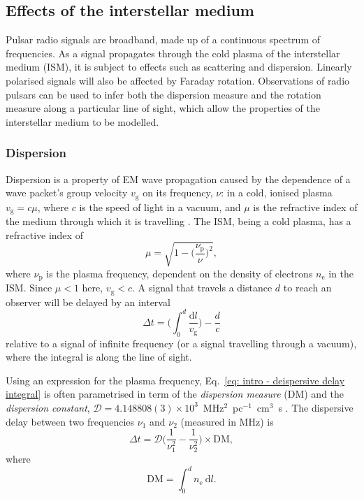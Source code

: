 \subsection{Effects of the interstellar medium}
\label{sec: intro - observation processing - ISM effects}

Pulsar radio signals are broadband, made up of a continuous spectrum of frequencies. As a signal propagates through the cold plasma of the interstellar medium (ISM), it is subject to effects such as scattering and dispersion. Linearly polarised signals will also be affected by Faraday rotation. Observations of radio pulsars can be used to infer both the dispersion measure and the rotation measure along a particular line of sight, which allow the properties of the interstellar medium to be modelled.

\subsubsection{Dispersion}
\label{sec: intro - observation processing - ISM effects - dispersion}

Dispersion is a property of EM wave propagation caused by the dependence of a wave packet's group velocity $v_\mathrm{g}$ on its frequency, $\nu$: in a cold, ionised plasma $v_\mathrm{g} = c\mu$, where $c$ is the speed of light in a vacuum, and $\mu$ is the refractive index of the medium through which it is travelling \citep{Handbook}. The ISM, being a cold plasma, has a refractive index of 
\begin{equation}
    \label{eq: intro - ISM refractive index}
    \mu = \sqrt{1-\bigg(\frac{\nu_\mathrm{p}}{\nu}\bigg)^2},
\end{equation}
where $\nu_\mathrm{p}$ is the plasma frequency, dependent on the density of electrons $n_\mathrm{e}$ in the ISM. Since $\mu < 1$ here, $v_\mathrm{g} < c$. A signal that travels a distance $d$ to reach an observer will be delayed by an interval
\begin{equation}
    \label{eq: intro - deispersive delay integral}
    \Delta t = \bigg( \int^d_0 \frac{\mathrm{d}l}{v_\mathrm{g}} \bigg) - \frac{d}{c}
\end{equation}
relative to a signal of infinite frequency (or a signal travelling through a vacuum), where the integral is along the line of sight.

Using an expression for the plasma frequency, Eq.~\ref{eq: intro - deispersive delay integral} is often parametrised in term of the \textit{dispersion measure} (DM) and the \textit{dispersion constant},  $\mathcal{D} = 4.148808(3)\times 10^3$~MHz$^2$~pc$^{-1}$~cm$^3$~s \citep{MTxx1972,Handbook}. The dispersive delay between two frequencies $\nu_1$ and $\nu_2$ (measured in MHz) is 
\begin{equation}
    \label{eq: intro - dispersive delay}
	\Delta t = \mathcal{D} \bigg(\frac{1}{\nu_1^2} - \frac{1}{\nu_2^2}\bigg) \times \mathrm{DM},
\end{equation}
where
\begin{equation}
    \label{eq: intro - dispersion measure definition}
	\mathrm{DM} = \int^d_0 n_\mathrm{e}\ \mathrm{d}l.
\end{equation}

